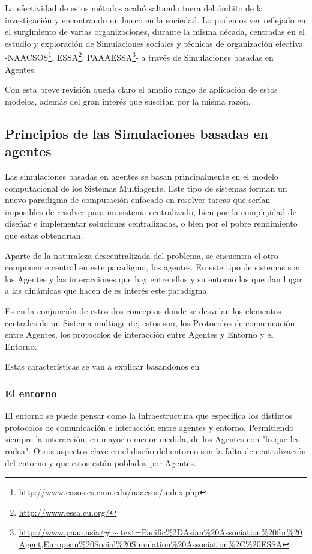 La efectividad de estos métodos acabó saltando fuera del ámbito de la investigación y encontrando un hueco en la sociedad. Lo podemos ver reflejado en el surgimiento de varias organizaciones, durante la misma década, centradas en el estudio y exploración de Simulaciones sociales y técnicas de organización efectiva -NAACSOS\footnote{\url{http://www.casos.cs.cmu.edu/naacsos/index.php}}, ESSA\footnote{\url{http://www.essa.eu.org/}}, PAAAESSA\footnote{\url{http://www.paaa.asia/\#:~:text=Pacific\%2DAsian\%20Association\%20for\%20Agent,European\%20Social\%20Simulation\%20Association\%2C\%20ESSA}}- a través de Simulaciones basadas en Agentes.

Con esta breve revisión queda claro el amplio rango de aplicación de estos modelos, además del gran interés que suscitan por la misma razón.

\subsection{Principios de las Simulaciones basadas en agentes}

Las simulaciones basadas en agentes se basan principalmente en el modelo computacional de los Sistemas Multiagente. Este tipo de sistemas forman un nuevo paradigma de computación enfocado en resolver tareas que serían imposibles de resolver para un sistema centralizado, bien por la complejidad de diseñar e implementar soluciones centralizadas, o bien por el pobre rendimiento que estas obtendrían.

Aparte de la naturaleza descentralizada del problema, se encuentra el otro componente central en este paradigma, los agentes. En este tipo de sistemas son los Agentes y las interacciones que hay entre ellos y su entorno los que dan lugar a las dinámicas que hacen de es interés este paradigma.

Es en la conjunción de estos dos conceptos donde se desvelan los elementos centrales de un Sistema multiagente, estos son, los Protocolos de comunicación entre Agentes, los protocolos de interacción entre Agentes y Entorno y el Entorno.

Estas características se van a explicar basandonos en \cite{weiss1999multiagent}

\subsubsection{El entorno}

El entorno se puede pensar como la infraestructura que especifica los distintos protocolos de comunicación e interacción entre agentes y entorno. Permitiendo siempre la interacción, en mayor o menor medida, de los Agentes con "lo que les rodea". Otros aspectos clave en el diseño del entorno son la falta de centralización del entorno y que estos están poblados por Agentes. 

